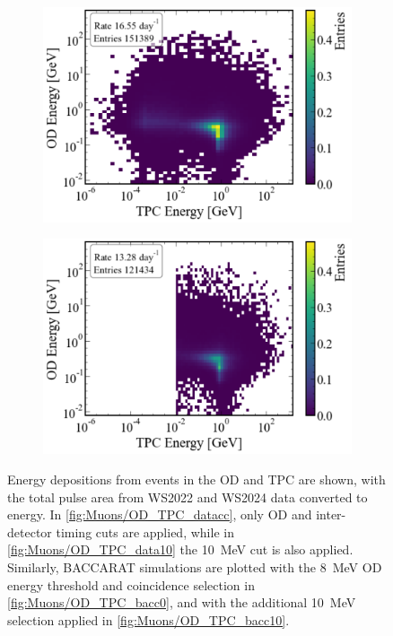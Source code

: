 \begin{figure}[ht!]
\begin{subfigure}{0.5\textwidth}
    \includegraphics[width=\textwidth]{figures/Muons/OD_TPC_bacc0.pdf}
    \caption{}
    \label{fig:Muons/OD_TPC_bacc0}
    \end{subfigure}
    \begin{subfigure}{0.5\textwidth}
    \centering
    \includegraphics[width=\textwidth]{figures/Muons/OD_TPC_bacc10.pdf}
    \caption{}
    \label{fig:Muons/OD_TPC_bacc10}
    \end{subfigure}
    \caption{Energy depositions from events in the OD and TPC are shown, with the total pulse area from WS2022 and WS2024 data converted to energy. In \autoref{fig:Muons/OD_TPC_datacc}, only OD and inter-detector timing cuts are applied, while in \autoref{fig:Muons/OD_TPC_data10} the 10~MeV cut is also applied. Similarly, BACCARAT simulations are plotted with the 8~MeV OD energy threshold and coincidence selection in \autoref{fig:Muons/OD_TPC_bacc0}, and with the additional 10~MeV selection applied in \autoref{fig:Muons/OD_TPC_bacc10}.}
    \label{fig:Muons/ODTPC_comp}
\end{figure}

